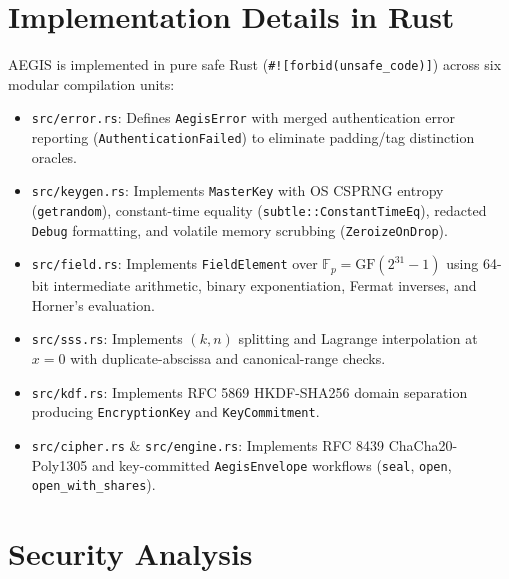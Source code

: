 \documentclass[11pt,a4paper]{article}
\theoremstyle{definition}
\newcommand{\Fp}{\mathbb{F}_p}
\begin{document}
\section{Implementation Details in Rust}

AEGIS is implemented in pure safe Rust (\texttt{\#![forbid(unsafe\_code)]}) across six modular compilation units:
\begin{itemize}
    \item \texttt{src/error.rs}: Defines \texttt{AegisError} with merged authentication error reporting (\texttt{AuthenticationFailed}) to eliminate padding/tag distinction oracles.
    \item \texttt{src/keygen.rs}: Implements \texttt{MasterKey} with OS CSPRNG entropy (\texttt{getrandom}), constant-time equality (\texttt{subtle::ConstantTimeEq}), redacted \texttt{Debug} formatting, and volatile memory scrubbing (\texttt{ZeroizeOnDrop}).
    \item \texttt{src/field.rs}: Implements \texttt{FieldElement} over $\Fp = \mathrm{GF}(2^{31}-1)$ using 64-bit intermediate arithmetic, binary exponentiation, Fermat inverses, and Horner's evaluation.
    \item \texttt{src/sss.rs}: Implements $(k,n)$ splitting and Lagrange interpolation at $x=0$ with duplicate-abscissa and canonical-range checks.
    \item \texttt{src/kdf.rs}: Implements RFC 5869 HKDF-SHA256 domain separation producing \texttt{EncryptionKey} and \texttt{KeyCommitment}.
    \item \texttt{src/cipher.rs} \& \texttt{src/engine.rs}: Implements RFC 8439 ChaCha20-Poly1305 and key-committed \texttt{AegisEnvelope} workflows (\texttt{seal}, \texttt{open}, \texttt{open\_with\_shares}).
\end{itemize}

\section{Security Analysis}
\end{document}
